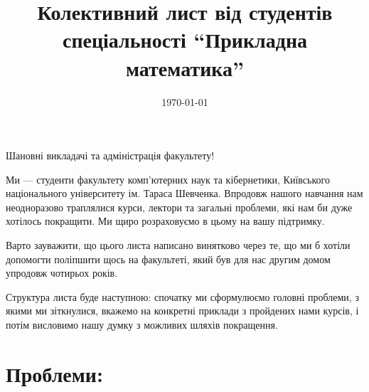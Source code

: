\documentclass[14pt, a4paper]{extarticle}  %
\title{Колективний лист від студентів спеціальності ``Прикладна математика''}
\date{\today}
\begin{document}
\maketitle

Шановні викладачі та адміністрація факультету!

Ми --- студенти факультету комп'ютерних наук та кібернетики, Київського національного університету ім. Тараса Шевченка. Впродовж нашого навчання нам неодноразово траплялися курси, лектори та загальні проблеми, які нам би дуже хотілось покращити. Ми щиро розраховуємо в цьому на вашу підтримку. 

Варто зауважити, що цього листа написано винятково через те, що ми б хотіли допомогти поліпшити щось на факультеті, який був для нас другим домом упродовж чотирьох років.

Структура листа буде наступною: спочатку ми сформулюємо головні проблеми, з якими ми зіткнулися, вкажемо на конкретні приклади з пройдених нами курсів, і потім висловимо нашу думку з можливих шляхів покращення. 

\tableofcontents

\section{Проблеми:}
\end{document}
